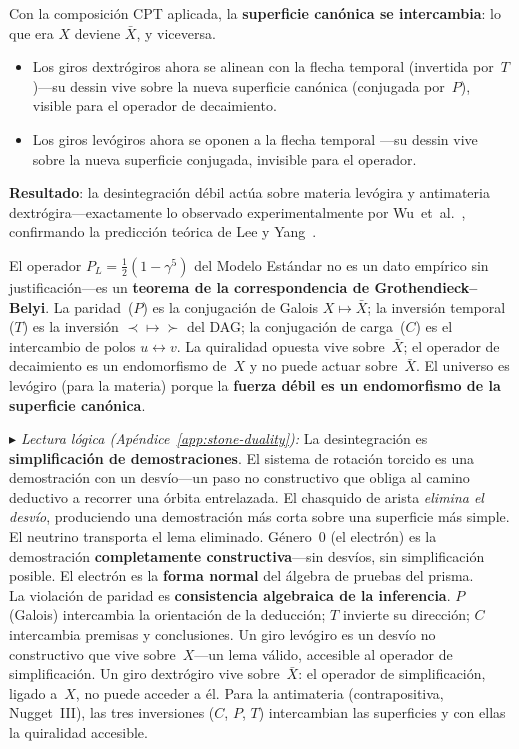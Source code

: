 \documentclass[11pt, a4paper, openany]{book}
\newcommand{\stoneref}[1]{%
  \smallskip\noindent
  {\small\color{structure!70}\textit{$\blacktriangleright$ Lectura
  l\'ogica (Ap\'endice~\ref{app:stone-duality}):} #1}%
  \smallskip}
\begin{document}
\medskip
Con la composici\'on CPT aplicada, la \textbf{superficie can\'onica
se intercambia}: lo que era $X$ deviene $\bar{X}$, y viceversa.
\begin{itemize}
  \item Los giros dextr\'ogiros ahora se alinean con la flecha
    temporal (invertida por~$T$)---su dessin vive sobre la nueva
    superficie can\'onica (conjugada por~$P$), visible para el
    operador de decaimiento.
  \item Los giros lev\'ogiros ahora se oponen a la flecha temporal
    ---su dessin vive sobre la nueva superficie conjugada, invisible
    para el operador.
\end{itemize}

\textbf{Resultado}: la desintegraci\'on d\'ebil act\'ua sobre materia
lev\'ogira y antimateria dextr\'ogira---exactamente lo observado
experimentalmente por Wu~et~al.~\cite{wu1957}, confirmando la
predicci\'on te\'orica de Lee y
Yang~\cite{leeyang1956}.

\begin{result}[title={La violaci\'on de paridad es un teorema de geometr\'ia algebraica}]
\label{res:parity-orientability}
El operador $P_L = \tfrac{1}{2}(1-\gamma^5)$ del Modelo Est\'andar no
es un dato emp\'irico sin justificaci\'on---es un \textbf{teorema de
la correspondencia de Grothendieck--Belyi}. La paridad~($P$) es la
conjugaci\'on de Galois $X \mapsto \bar{X}$; la inversi\'on temporal
($T$) es la inversi\'on ${\prec} \mapsto {\succ}$ del DAG; la
conjugaci\'on de carga~($C$) es el intercambio de polos
$u \leftrightarrow v$. La quiralidad opuesta vive sobre~$\bar{X}$;
el operador de decaimiento es un endomorfismo de~$X$ y no puede actuar
sobre~$\bar{X}$. El universo es lev\'ogiro (para la materia) porque
la \textbf{fuerza d\'ebil es un endomorfismo de la superficie
can\'onica}.
\end{result}

\stoneref{La desintegraci\'on es \textbf{simplificaci\'on de
demostraciones}. El sistema de rotaci\'on torcido es una demostraci\'on
con un desv\'io---un paso no constructivo que obliga al camino
deductivo a recorrer una \'orbita entrelazada. El chasquido de arista
\emph{elimina el desv\'io}, produciendo una demostraci\'on m\'as corta
sobre una superficie m\'as simple. El neutrino transporta el lema
eliminado. G\'enero~0 (el electr\'on) es la demostraci\'on
\textbf{completamente constructiva}---sin desv\'ios, sin
simplificaci\'on posible. El electr\'on es la \textbf{forma normal} del
\'algebra de pruebas del prisma.
\smallskip\\
La violaci\'on de paridad es \textbf{consistencia algebraica de la
inferencia}. $P$ (Galois) intercambia la orientaci\'on de la deducci\'on;
$T$ invierte su direcci\'on; $C$ intercambia premisas y conclusiones.
Un giro lev\'ogiro es un desv\'io no constructivo que vive sobre~$X$---un
lema v\'alido, accesible al operador de simplificaci\'on. Un giro
dextr\'ogiro vive sobre~$\bar{X}$: el operador de simplificaci\'on,
ligado a~$X$, no puede acceder a \'el. Para la antimateria
(contrapositiva, Nugget~III), las tres inversiones ($C$, $P$, $T$)
intercambian las superficies y con ellas la quiralidad accesible.}
\end{document}
